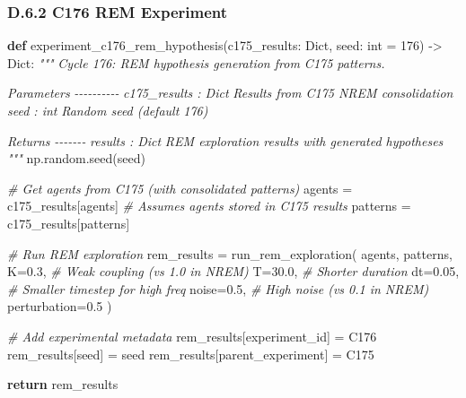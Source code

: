 \documentclass[
]{article}
\newenvironment{Shaded}{}{}
\newcommand{\BuiltInTok}[1]{\textcolor[rgb]{0.00,0.50,0.00}{#1}}
\newcommand{\CommentTok}[1]{\textcolor[rgb]{0.38,0.63,0.69}{\textit{#1}}}
\newcommand{\ControlFlowTok}[1]{\textcolor[rgb]{0.00,0.44,0.13}{\textbf{#1}}}
\newcommand{\DecValTok}[1]{\textcolor[rgb]{0.25,0.63,0.44}{#1}}
\newcommand{\FloatTok}[1]{\textcolor[rgb]{0.25,0.63,0.44}{#1}}
\newcommand{\KeywordTok}[1]{\textcolor[rgb]{0.00,0.44,0.13}{\textbf{#1}}}
\newcommand{\NormalTok}[1]{#1}
\newcommand{\OperatorTok}[1]{\textcolor[rgb]{0.40,0.40,0.40}{#1}}
\newcommand{\StringTok}[1]{\textcolor[rgb]{0.25,0.44,0.63}{#1}}
\begin{document}
\subsubsection{D.6.2 C176 REM
Experiment}\label{d.6.2-c176-rem-experiment}

\begin{Shaded}
\begin{Highlighting}[]
\KeywordTok{def}\NormalTok{ experiment\_c176\_rem\_hypothesis(c175\_results: Dict,}
\NormalTok{                                  seed: }\BuiltInTok{int} \OperatorTok{=} \DecValTok{176}\NormalTok{) }\OperatorTok{{-}\textgreater{}}\NormalTok{ Dict:}
    \CommentTok{"""}
\CommentTok{    Cycle 176: REM hypothesis generation from C175 patterns.}

\CommentTok{    Parameters}
\CommentTok{    {-}{-}{-}{-}{-}{-}{-}{-}{-}{-}}
\CommentTok{    c175\_results : Dict}
\CommentTok{        Results from C175 NREM consolidation}
\CommentTok{    seed : int}
\CommentTok{        Random seed (default 176)}

\CommentTok{    Returns}
\CommentTok{    {-}{-}{-}{-}{-}{-}{-}}
\CommentTok{    results : Dict}
\CommentTok{        REM exploration results with generated hypotheses}
\CommentTok{    """}
\NormalTok{    np.random.seed(seed)}

    \CommentTok{\# Get agents from C175 (with consolidated patterns)}
\NormalTok{    agents }\OperatorTok{=}\NormalTok{ c175\_results[}\StringTok{\textquotesingle{}agents\textquotesingle{}}\NormalTok{]  }\CommentTok{\# Assumes agents stored in C175 results}
\NormalTok{    patterns }\OperatorTok{=}\NormalTok{ c175\_results[}\StringTok{\textquotesingle{}patterns\textquotesingle{}}\NormalTok{]}

    \CommentTok{\# Run REM exploration}
\NormalTok{    rem\_results }\OperatorTok{=}\NormalTok{ run\_rem\_exploration(}
\NormalTok{        agents,}
\NormalTok{        patterns,}
\NormalTok{        K}\OperatorTok{=}\FloatTok{0.3}\NormalTok{,          }\CommentTok{\# Weak coupling (vs 1.0 in NREM)}
\NormalTok{        T}\OperatorTok{=}\FloatTok{30.0}\NormalTok{,         }\CommentTok{\# Shorter duration}
\NormalTok{        dt}\OperatorTok{=}\FloatTok{0.05}\NormalTok{,        }\CommentTok{\# Smaller timestep for high freq}
\NormalTok{        noise}\OperatorTok{=}\FloatTok{0.5}\NormalTok{,      }\CommentTok{\# High noise (vs 0.1 in NREM)}
\NormalTok{        perturbation}\OperatorTok{=}\FloatTok{0.5}
\NormalTok{    )}

    \CommentTok{\# Add experimental metadata}
\NormalTok{    rem\_results[}\StringTok{\textquotesingle{}experiment\_id\textquotesingle{}}\NormalTok{] }\OperatorTok{=} \StringTok{\textquotesingle{}C176\textquotesingle{}}
\NormalTok{    rem\_results[}\StringTok{\textquotesingle{}seed\textquotesingle{}}\NormalTok{] }\OperatorTok{=}\NormalTok{ seed}
\NormalTok{    rem\_results[}\StringTok{\textquotesingle{}parent\_experiment\textquotesingle{}}\NormalTok{] }\OperatorTok{=} \StringTok{\textquotesingle{}C175\textquotesingle{}}

    \ControlFlowTok{return}\NormalTok{ rem\_results}
\end{Highlighting}
\end{Shaded}
\end{document}
